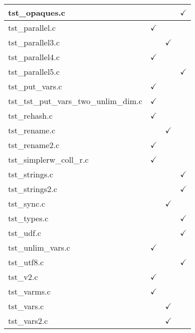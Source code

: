\begin{table}[H]
\begin{tabular}{|l|c|c|c|}
tst\_opaques.c          &               &               & $\checkmark$  \\ \hline
tst\_parallel.c         & $\checkmark$  &               &               \\ \hline
tst\_parallel3.c        &               & $\checkmark$  &               \\ \hline
tst\_parallel4.c        & $\checkmark$  &               &               \\ \hline
tst\_parallel5.c        &               &               & $\checkmark$  \\ \hline
tst\_put\_vars.c        & $\checkmark$  &               &               \\ \hline
tst\_tst\_put\_vars\_two\_unlim\_dim.c & $\checkmark$ & &               \\ \hline
tst\_rehash.c           & $\checkmark$  &               &               \\ \hline
tst\_rename.c           &               & $\checkmark$  &               \\ \hline
tst\_rename2.c          & $\checkmark$  &               &               \\ \hline
tst\_simplerw\_coll\_r.c & $\checkmark$ &               &               \\ \hline
tst\_strings.c          &               &               & $\checkmark$  \\ \hline
tst\_strings2.c         &               &               & $\checkmark$  \\ \hline
tst\_sync.c             &               & $\checkmark$  &               \\ \hline
tst\_types.c            &               &               & $\checkmark$  \\ \hline
tst\_udf.c              &               &               & $\checkmark$  \\ \hline
tst\_unlim\_vars.c      & $\checkmark$  &               &               \\ \hline
tst\_utf8.c             &               &               & $\checkmark$  \\ \hline
tst\_v2.c               & $\checkmark$  &               &               \\ \hline
tst\_varms.c            & $\checkmark$  &               &               \\ \hline
tst\_vars.c             &               & $\checkmark$  &               \\ \hline
tst\_vars2.c            &               & $\checkmark$  &               \\ \hline

\end{tabular}
\end{table}
